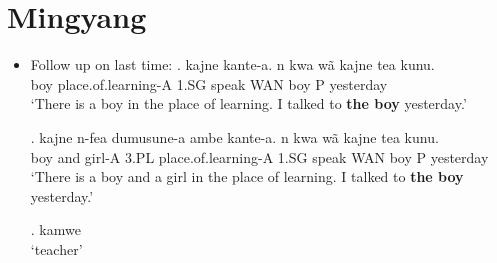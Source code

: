 \documentclass{assets/fieldnotes}
\begin{document}
\section{Mingyang}

\begin{itemize}
    \item Follow up on last time: 
    \exg. kajne kante-a. n kwa wã kajne tea kunu.\\
   boy place.of.learning-A 1.SG speak WAN boy P yesterday\\
   `There is a boy in the place of learning. I talked to \textbf{the boy} yesterday.'

    \exg. kajne n-fea dumusune-a ambe kante-a. n kwa wã kajne tea kunu.\\
    boy and girl-A 3.PL place.of.learning-A 1.SG speak WAN boy P yesterday\\
   `There is a boy and a girl in the place of learning. I talked to \textbf{the boy} yesterday.'

    \ex. kamwe\\
        `teacher'


\end{itemize}
\end{document}
